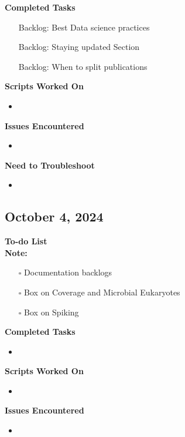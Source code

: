 \documentclass[11pt]{report}
\newcommand{\done}{\checkmark}
\newcommand{\pending}{$\square$}
\begin{document}
{\begin{multicols}{2}
	\textbf{Completed Tasks}
	\begin{itemize}
		\item [\done] Backlog: Best Data science practices 
		\item [\done] Backlog: Staying updated Section
		\item [\done] Backlog: When to split publications
		
	\end{itemize}
	
	\textbf{Scripts Worked On}
	\begin{itemize}
		\item
	\end{itemize}
	
	
	\textbf{Issues Encountered}
	\begin{itemize}
		\item 
	\end{itemize}
	
	\textbf{Need to Troubleshoot}
	\begin{itemize}
		\item 
	\end{itemize}
\end{multicols}

\newpage


\begin{multicols}{2}
	\section{October 4, 2024}
	
	
	\textbf{To-do List} \\
	\textbf{Note:} 
	
	\begin{itemize}
		\item [\pending] Documentation backlogs
		\item [\pending] Box on Coverage and Microbial Eukaryotes
		\item [\pending] Box on Spiking 
	\end{itemize}
	
	\textbf{Completed Tasks}
	\begin{itemize}
		\item 
	\end{itemize}
	
	\textbf{Scripts Worked On}
	\begin{itemize}
		\item
	\end{itemize}
	
	
	\textbf{Issues Encountered}
	\begin{itemize}
		\item 
	\end{itemize}
	

\end{multicols}}
\end{document}
